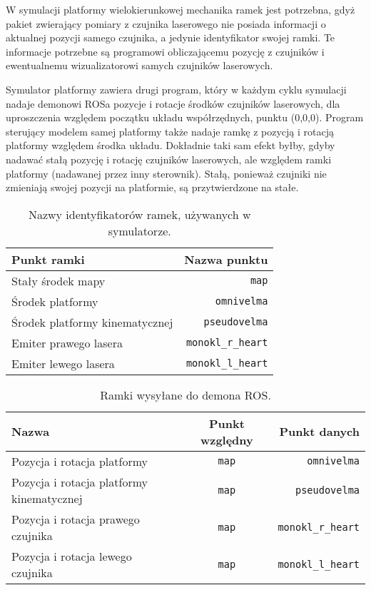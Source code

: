 	W symulacji platformy wielokierunkowej mechanika ramek jest potrzebna, gdyż pakiet zwierający pomiary z czujnika laserowego nie posiada informacji o aktualnej
	pozycji samego czujnika, a jedynie identyfikator swojej ramki. Te informacje potrzebne są programowi obliczającemu pozycję z czujników i ewentualnemu wizualizatorowi samych
	czujników laserowych.
	
	Symulator platformy zawiera drugi program, który w każdym cyklu symulacji nadaje demonowi ROSa pozycje i rotacje środków czujników laserowych, dla uproszczenia
	względem początku układu współrzędnych, punktu (0,0,0). 
	Program sterujący modelem samej platformy także nadaje ramkę z pozycją i rotacją platformy względem środka układu.
	Dokładnie taki sam efekt byłby, gdyby nadawać stałą pozycję i rotację czujników laserowych, ale względem ramki platformy (nadawanej przez inny sterownik).
	Stałą, ponieważ czujniki nie zmieniają swojej pozycji na platformie, są przytwierdzone na stałe.
	
	\begin{table}
	\centering
	\begin{tabular}{l r}
	Punkt ramki & Nazwa punktu \\
	\hline
	Stały środek mapy & \texttt{map} \\
	Środek platformy & \texttt{omnivelma} \\
	Środek platformy kinematycznej & \texttt{pseudovelma} \\
	Emiter prawego lasera & \texttt{monokl\_r\_heart} \\
	Emiter lewego lasera & \texttt{monokl\_l\_heart} \\
	\end{tabular}
	\caption{Nazwy identyfikatorów ramek, używanych w symulatorze.}
	\label{tab:frames}
	\end{table}
	
	\begin{table}
	\centering
	\begin{tabular}{l c r}
	Nazwa & Punkt względny & Punkt danych \\
	\hline
	Pozycja i rotacja platformy & \texttt{map} & \texttt{omnivelma} \\
	Pozycja i rotacja platformy kinematycznej & \texttt{map} & \texttt{pseudovelma} \\
	Pozycja i rotacja prawego czujnika & \texttt{map} & \texttt{monokl\_r\_heart} \\
	Pozycja i rotacja lewego czujnika & \texttt{map} & \texttt{monokl\_l\_heart} \\
	\end{tabular}
	\caption{Ramki wysyłane do demona ROS.}
	\label{tab:frame_send}
	\end{table}

